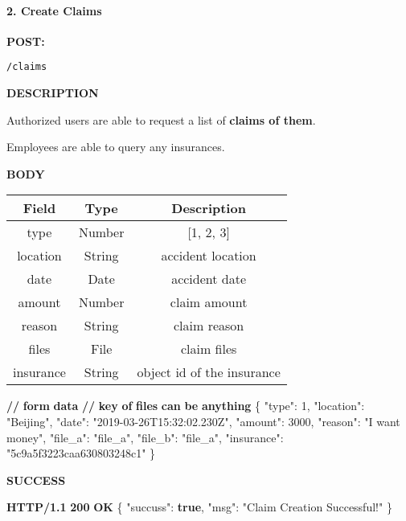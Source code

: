 \documentclass[
]{article}
\newenvironment{Shaded}{}{}
\newcommand{\DataTypeTok}[1]{\textcolor[rgb]{0.56,0.13,0.00}{#1}}
\newcommand{\DecValTok}[1]{\textcolor[rgb]{0.25,0.63,0.44}{#1}}
\newcommand{\ErrorTok}[1]{\textcolor[rgb]{1.00,0.00,0.00}{\textbf{#1}}}
\newcommand{\FunctionTok}[1]{\textcolor[rgb]{0.02,0.16,0.49}{#1}}
\newcommand{\KeywordTok}[1]{\textcolor[rgb]{0.00,0.44,0.13}{\textbf{#1}}}
\newcommand{\StringTok}[1]{\textcolor[rgb]{0.25,0.44,0.63}{#1}}
\begin{document}
\hypertarget{header-n845}{%
\paragraph{2. Create Claims}\label{header-n845}}

\textbf{POST:}

\begin{verbatim}
/claims
\end{verbatim}

\textbf{DESCRIPTION}

Authorized users are able to request a list of \textbf{claims of them}.

Employees are able to query any insurances.

\textbf{BODY}

\begin{longtable}[]{@{}ccc@{}}
\toprule
Field & Type & Description\tabularnewline
\midrule
\endhead
type & Number & {[}1, 2, 3{]}\tabularnewline
location & String & accident location\tabularnewline
date & Date & accident date\tabularnewline
amount & Number & claim amount\tabularnewline
reason & String & claim reason\tabularnewline
files & File & claim files\tabularnewline
insurance & String & object id of the insurance\tabularnewline
\bottomrule
\end{longtable}

\begin{Shaded}
\begin{Highlighting}[]
\ErrorTok{//} \ErrorTok{form} \ErrorTok{data}
\ErrorTok{//} \ErrorTok{key} \ErrorTok{of} \ErrorTok{files} \ErrorTok{can} \ErrorTok{be} \ErrorTok{anything}
\FunctionTok{\{}
	\DataTypeTok{"type"}\FunctionTok{:} \DecValTok{1}\FunctionTok{,}
    \DataTypeTok{"location"}\FunctionTok{:} \StringTok{"Beijing"}\FunctionTok{,}
	\DataTypeTok{"date"}\FunctionTok{:} \StringTok{"2019-03-26T15:32:02.230Z"}\FunctionTok{,}
	\DataTypeTok{"amount"}\FunctionTok{:} \DecValTok{3000}\FunctionTok{,}
	\DataTypeTok{"reason"}\FunctionTok{:} \StringTok{"I want money"}\FunctionTok{,}
    \DataTypeTok{"file_a"}\FunctionTok{:} \StringTok{"file_a"}\FunctionTok{,}
    \DataTypeTok{"file_b"}\FunctionTok{:} \StringTok{"file_a"}\FunctionTok{,}
	\DataTypeTok{"insurance"}\FunctionTok{:} \StringTok{"5c9a5f3223caa630803248c1"}
\FunctionTok{\}}
\end{Highlighting}
\end{Shaded}

\textbf{SUCCESS}

\begin{Shaded}
\begin{Highlighting}[]
\ErrorTok{HTTP/1.1} \ErrorTok{200} \ErrorTok{OK}
\FunctionTok{\{}
    \DataTypeTok{"succuss"}\FunctionTok{:} \KeywordTok{true}\FunctionTok{,}
    \DataTypeTok{"msg"}\FunctionTok{:} \StringTok{"Claim Creation Successful!"}
\FunctionTok{\}}
\end{Highlighting}
\end{Shaded}
\end{document}
